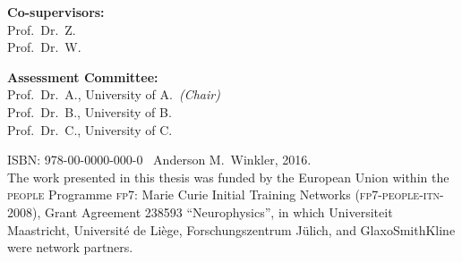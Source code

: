 \vspace*{5mm}

\noindent
\textbf{Co-supervisors:}\\
Prof.\ Dr.\ Z.\\
Prof.\ Dr.\ W.

\vspace*{5mm}

\noindent
\textbf{Assessment Committee:}\\
Prof.\ Dr.\ A., University of A.\ \emph{(Chair)}\\
Prof.\ Dr.\ B., University of B.\\
Prof.\ Dr.\ C., University of C.

\vfill

\noindent
ISBN: 978-00-0000-000-0 \textcopyright\ Anderson M.\ Winkler, 2016.\\
The work presented in this thesis was funded by the European Union within the \textsc{people} Programme \textsc{fp7}: Marie Curie Initial Training Networks (\textsc{fp7-people-itn-2008}), Grant Agreement 238593 ``Neurophysics'', in which Universiteit Maas\-tricht, Universit\'{e} de Li\`{e}ge, Forschungszentrum J\"{u}lich, and GlaxoSmithKline were network partners.

